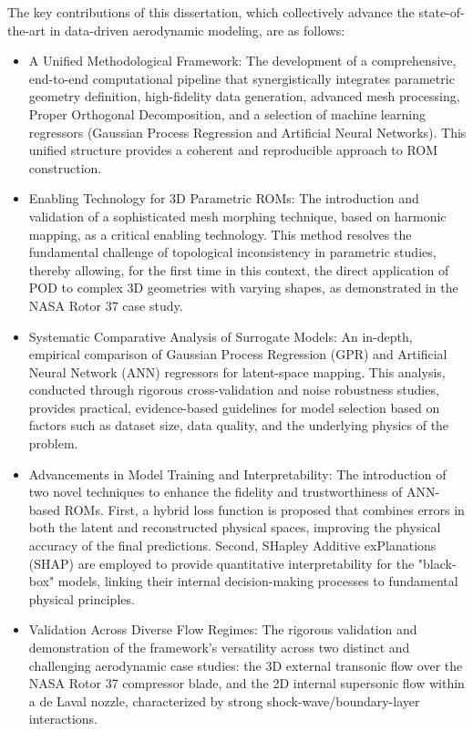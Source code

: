 \documentclass[dscexam, EN]{ufabcFHZh}
\begin{document}
The key contributions of this dissertation, which collectively advance the state-of-the-art in data-driven aerodynamic modeling, are as follows:

\begin{itemize}
    \item A Unified Methodological Framework: The development of a comprehensive, end-to-end computational pipeline that synergistically integrates parametric geometry definition, high-fidelity data generation, advanced mesh processing, Proper Orthogonal Decomposition, and a selection of machine learning regressors (Gaussian Process Regression and Artificial Neural Networks). This unified structure provides a coherent and reproducible approach to ROM construction.

    \item Enabling Technology for 3D Parametric ROMs: The introduction and validation of a sophisticated mesh morphing technique, based on harmonic mapping, as a critical enabling technology. This method resolves the fundamental challenge of topological inconsistency in parametric studies, thereby allowing, for the first time in this context, the direct application of POD to complex 3D geometries with varying shapes, as demonstrated in the NASA Rotor 37 case study. 

    \item Systematic Comparative Analysis of Surrogate Models: An in-depth, empirical comparison of Gaussian Process Regression (GPR) and Artificial Neural Network (ANN) regressors for latent-space mapping. This analysis, conducted through rigorous cross-validation and noise robustness studies, provides practical, evidence-based guidelines for model selection based on factors such as dataset size, data quality, and the underlying physics of the problem.  

    \item Advancements in Model Training and Interpretability: The introduction of two novel techniques to enhance the fidelity and trustworthiness of ANN-based ROMs. First, a hybrid loss function is proposed that combines errors in both the latent and reconstructed physical spaces, improving the physical accuracy of the final predictions. Second, SHapley Additive exPlanations (SHAP) are employed to provide quantitative interpretability for the "black-box" models, linking their internal decision-making processes to fundamental physical principles. 

    \item Validation Across Diverse Flow Regimes: The rigorous validation and demonstration of the framework's versatility across two distinct and challenging aerodynamic case studies: the 3D external transonic flow over the NASA Rotor 37 compressor blade, and the 2D internal supersonic flow within a de Laval nozzle, characterized by strong shock-wave/boundary-layer interactions.
\end{itemize}
\end{document}
